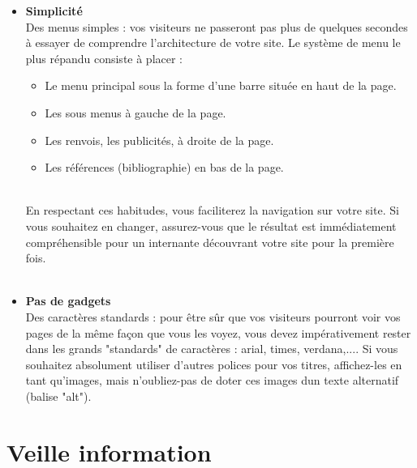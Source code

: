 \documentclass[11pt,twoside,a4paper]{article}
\begin{document}

{\ttfamily%
{\footnotesize%
\begin{minipage}[t]{18cm} 
\begin{itemize}

	\item[] \textbf{Simplicit{\'e}}~\\
	Des menus simples : vos visiteurs ne passeront pas plus de quelques secondes {\`a} essayer de comprendre l'architecture de votre site. Le syst{\`e}me de menu le plus r{\'e}pandu consiste {\`a} placer : 
	\begin{itemize}
		\item Le menu principal sous la forme d'une barre situ{\'e}e en haut de la page. 
		\item Les sous menus {\`a} gauche de la page. 
		\item Les renvois, les publicit{\'e}s, {\`a} droite de la page. 
		\item Les r{\'e}f{\'e}rences (bibliographie) en bas de la page. 
	\end{itemize}~\\
	
	En respectant ces habitudes, vous faciliterez la navigation sur votre site. Si vous souhaitez en changer, assurez-vous que le r{\'e}sultat est imm{\'e}diatement compr{\'e}hensible pour un internante d{\'e}couvrant votre site pour la premi{\`e}re fois.~\\~\\

	\item[] \textbf{Pas de gadgets}~\\
	Des caract{\`e}res standards : pour {\^e}tre s{\^u}r que vos visiteurs pourront voir vos pages de la m{\^e}me fa\c{c}on que vous les voyez, vous devez imp{\'e}rativement rester dans les grands "standards" de caract{\`e}res : arial, times, verdana,.... Si vous souhaitez absolument utiliser d'autres polices pour vos titres, affichez-les en tant qu'images, mais n'oubliez-pas de doter ces images dun texte alternatif (balise "alt").
	
\end{itemize}

\end{minipage}
 } }%


\section{Veille information}
\end{document}
